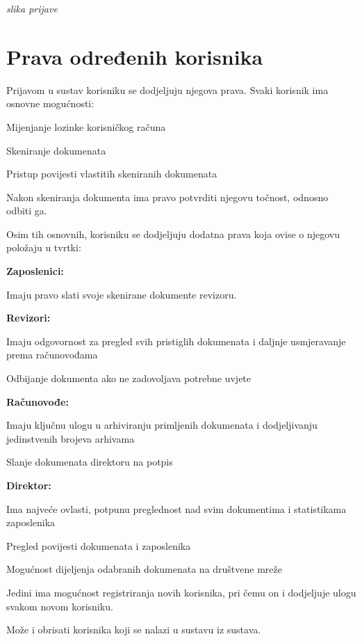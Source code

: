 		\textit{slika prijave}
		
		\section{Prava određenih korisnika}

		Prijavom u sustav korisniku se dodjeljuju njegova prava. Svaki korisnik ima osnovne mogućnosti:
		\begin{packed_item}
			\item Mijenjanje lozinke korisničkog računa
			\item Skeniranje dokumenata
			\item Pristup povijesti vlastitih skeniranih dokumenata
			\item Nakon skeniranja dokumenta ima pravo potvrditi njegovu točnost, odnosno odbiti ga.
		\end{packed_item}
		
		Osim tih osnovnih, korisniku se dodjeljuju dodatna prava koja ovise o njegovu položaju u tvrtki:
		\begin{packed_item}
			\item \textbf{Zaposlenici:} 
					\begin{packed_item}
						\item Imaju pravo slati svoje skenirane dokumente revizoru.
					\end{packed_item}
			\item \textbf{Revizori:} 
					\begin{packed_item}
						\item Imaju odgovornost za pregled svih pristiglih dokumenata i daljnje usmjeravanje prema računovođama
						\item Odbijanje dokumenta ako ne zadovoljava potrebne uvjete 
					\end{packed_item}
			\item \textbf{Računovođe:} 
						\begin{packed_item}
						\item Imaju ključnu ulogu u arhiviranju primljenih dokumenata i dodjeljivanju jedinstvenih brojeva arhivama
						\item Slanje dokumenata direktoru na potpis
					\end{packed_item}
			\item \textbf{Direktor:}
						\begin{packed_item} 
							\item Ima najveće ovlasti, potpunu preglednost nad svim dokumentima i statistikama zaposlenika
							\item Pregled povijesti dokumenata i zaposlenika
							\item Mogućnost dijeljenja odabranih dokumenata na društvene mreže
							\item Jedini ima mogućnost registriranja novih korisnika, pri čemu on i dodjeljuje ulogu svakom novom korisniku. 
							\item Može i obrisati korisnika koji se nalazi u sustavu iz sustava.
						\end{packed_item}
		\end{packed_item}
		
